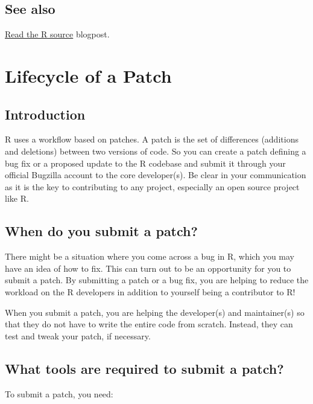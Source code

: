 \documentclass[
  letterpaper,
  DIV=11,
  numbers=noendperiod]{scrreprt}
\begin{document}
\section{See also}\label{see-also-3}

\href{https://blog.r-hub.io/2019/05/14/read-the-source/}{Read the R
source} blogpost.


\chapter{Lifecycle of a Patch}\label{FixBug}

\section{Introduction}\label{introduction-1}

R uses a workflow based on patches. A patch is the set of differences
(additions and deletions) between two versions of code. So you can
create a patch defining a bug fix or a proposed update to the R codebase
and submit it through your official Bugzilla account to the core
developer(s). Be clear in your communication as it is the key to
contributing to any project, especially an open source project like R.

\section{When do you submit a patch?}\label{when-do-you-submit-a-patch}

There might be a situation where you come across a bug in R, which you
may have an idea of how to fix. This can turn out to be an opportunity
for you to submit a patch. By submitting a patch or a bug fix, you are
helping to reduce the workload on the R developers in addition to
yourself being a contributor to R!

When you submit a patch, you are helping the developer(s) and
maintainer(s) so that they do not have to write the entire code from
scratch. Instead, they can test and tweak your patch, if necessary.

\section{What tools are required to submit a
patch?}\label{what-tools-are-required-to-submit-a-patch}

To submit a patch, you need:
\end{document}

